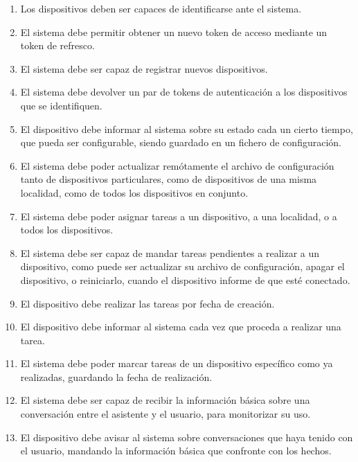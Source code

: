\begin{enumerate}
    \item Los dispositivos deben ser capaces de identificarse ante el sistema.

    \item El sistema debe permitir obtener un nuevo token de acceso mediante un token de refresco.

    \item El sistema debe ser capaz de registrar nuevos dispositivos.

    \item El sistema debe devolver un par de tokens de autenticación a los dispositivos que se identifiquen.

    \item El dispositivo debe informar al sistema sobre su estado cada un cierto tiempo, que pueda ser configurable, siendo guardado en un fichero de configuración.

    \item El sistema debe poder actualizar remótamente el archivo de configuración tanto de dispositivos particulares, como de dispositivos de una misma localidad, como de todos los dispositivos en conjunto.

    \item El sistema debe poder asignar tareas a un dispositivo, a una localidad, o a todos los dispositivos.

    \item El sistema debe ser capaz de mandar tareas pendientes a realizar a un dispositivo, como puede ser actualizar su archivo de configuración, apagar el dispositivo, o reiniciarlo, cuando el dispositivo informe de que esté conectado.

    \item El dispositivo debe realizar las tareas por fecha de creación.

    \item El dispositivo debe informar al sistema cada vez que proceda a realizar una tarea.

    \item El sistema debe poder marcar tareas de un dispositivo específico como ya realizadas, guardando la fecha de realización.

    \item El sistema debe ser capaz de recibir la información básica sobre una conversación entre el asistente y el usuario, para monitorizar su uso.

    \item El dispositivo debe avisar al sistema sobre conversaciones que haya tenido con el usuario, mandando la información básica que confronte con los hechos.


\end{enumerate}
